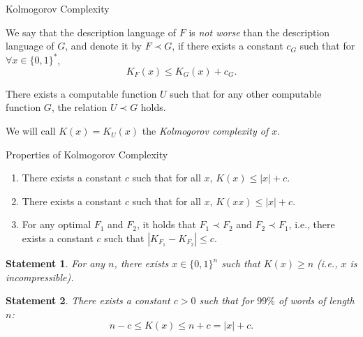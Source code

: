 \documentclass[aspectratio=169]{beamer}
\newtheorem{statement}{Statement}
\newcommand{\bits}{\{0,1\}}
\newcommand{\bitstr}{\bits^*}
\begin{document}
\begin{frame}{Kolmogorov Complexity}
\begin{definition}
    We say that the description language of $F$ is \emph{not worse} than the description language of $G$, and denote it by $F \prec G$, if there exists a constant $c_G$ such that for $\forall x \in \bitstr$,
    \[K_F(x) \le K_G(x) + c_G.\]
\end{definition}

\pause
\begin{theorem}\label{thm:solomonov-kolmogorov}
    There exists a computable function $U$ such that for any other computable function $G$, the relation $U \prec G$ holds.
\end{theorem}

\begin{definition}
    We will call $K(x) = K_U(x)$ the \emph{Kolmogorov complexity of $x$}.
\end{definition}

\end{frame}


\begin{frame}[fragile]{Properties of Kolmogorov Complexity}

    \begin{enumerate}
    \item There exists a constant $c$ such that for all $x$, $K(x) \le |x| + c$.
    \item There exists a constant $c$ such that for all $x$, $K(xx) \le |x| + c$.
    \item For any optimal $F_1$ and $F_2$, it holds that $F_1 \prec F_2$ and $F_2 \prec F_1$, i.e., there exists a constant $c$ such that
    \(
    |K_{F_1} - K_{F_2}| \le c.
    \)
\end{enumerate}
\pause
\begin{statement}
    For any $n$, there exists $x \in \{0,1\}^n$ such that $K(x) \ge n$ (i.e., $x$ is incompressible).
\end{statement}

\begin{statement}
    There exists a constant $c > 0$ such that for $99\%$ of words of length $n$:
    \[
    n - c \le K(x) \le n + c = |x| + c.
    \]
\end{statement}
\end{frame}
\end{document}
